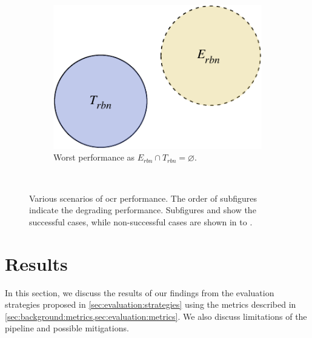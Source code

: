 \begin{figure}[p]
\begin{subfigure}[b]{0.475\textwidth}
  \end{subfigure}
  \hspace{\fill} 
  \bigskip
  \\
  \begin{subfigure}[b]{0.475\textwidth}
    \includegraphics[width=\textwidth]{images/evaluation/set_explain/T_mutually_exclusive_E}
    \caption{Worst performance as $E_{rbn} \cap T_{rbn} = \varnothing$.}
    \label{fig:evaluation:metrics:character_rec:sets:worst}
  \end{subfigure}
  \bigskip
  \\
  \caption[Euler diagram to illustrate OCR performance]{Various scenarios of \gls{ocr} performance. The order of subfigures indicate the degrading performance. Subfigures  and  show the successful cases, while non-successful cases are shown in  to . }
  \label{fig:evaluation:metrics:character_rec:sets}
\end{figure}

\clearpage
\section{Results}
\label{sec:evaluation:results}

In this section, we discuss the results of our findings from the evaluation strategies proposed in \cref{sec:evaluation:strategies} using the metrics described in \cref{sec:background:metrics,sec:evaluation:metrics}. We also discuss limitations of the pipeline and possible mitigations.

